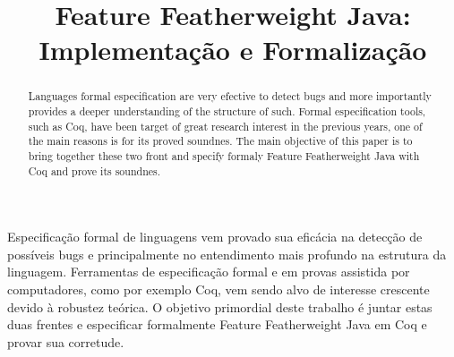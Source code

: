 \documentclass[bacharelado]{unb-cic}
\title{Feature Featherweight Java: Implementação e Formalização}
\begin{document}
  \maketitle
  \pretextual



  \begin{resumo}
  Especificação formal de linguagens vem provado sua eficácia na detecção de possíveis bugs e principalmente no entendimento mais profundo na estrutura da linguagem. Ferramentas de especificação formal e em provas assistida por computadores, como por exemplo Coq, vem sendo alvo de interesse crescente devido à robustez teórica. O objetivo primordial deste trabalho é juntar estas duas frentes e especificar formalmente Feature Featherweight Java em Coq e provar sua corretude.
  \end{resumo}

  \begin{abstract}
  Languages formal especification are very efective to detect bugs and more importantly provides a deeper understanding of the structure of such. Formal especification tools, such as Coq, have been target of great research interest in the previous years, one of the main reasons is for its proved soundnes. The main objective of this paper is to bring together these two front and specify formaly Feature Featherweight Java with Coq and prove its soundnes.
  \end{abstract}

  \tableofcontents

  \textual
  
  

  \postextual
  
  
\end{document}
